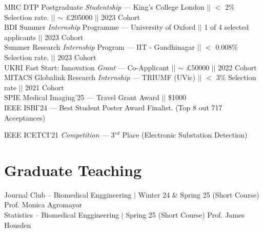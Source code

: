 \documentclass[letterpaper,10pt]{article}
\begin{document}
MRC DTP Postgraduate \textit{Studentship} \hspace*{2.8mm} --- King's College London $||$ $<$ 2\% Selection rate. $||$ $\sim$ \pounds205000 $||$ 2023 Cohort \\
BDI Summer \textit{Internship} Programme \hspace*{4mm} --- University of Oxford $||$ 1 of 4 selected applicants $||$ 2023 Cohort\\
Summer Research \textit{Internship} Program \hspace*{1.5mm} --- IIT - Gandhinagar $||$ $<$ 0.008\% Selection rate. $||$ 2023 Cohort
\\
UKRI Fast Start: Innovation \textit{Grant} \hspace*{5.5mm} --- Co-Applicant $||$ $\sim$ \pounds50000 $||$ 2022 Cohort \\
MITACS Globalink Research \textit{Internship} --- TRIUMF (UVic) $||$ $<$ 3\% Selection rate $||$ 2021 Cohort
\\

SPIE Medical Imaging'25 \hspace{0.55cm} --- Travel Grant Award $||$ \$1000 \\

IEEE ISBI'24  \hspace{2.25cm} --- Best Student Poster Award Finalist. (Top 8 out 717 Acceptances)

IEEE ICETCI'21 \textit{Competition}  --- 3$^{rd}$ Place (Electronic Substation Detection)

\vspace{-3mm}

\section{Graduate Teaching}
\vspace{-1mm}
Journal Club -- Biomedical Enggineering $|$ Winter 24 \& Spring 25 {\scriptsize(Short Course)} \hfill{} Prof. Monica Agromayor\\
Statistics \hspace{0.56cm}-- Biomedical Enggineering 
 $|$ Spring 25 {\scriptsize(Short Course)} \hfill{} Prof.  James Housden\\
\end{document}
